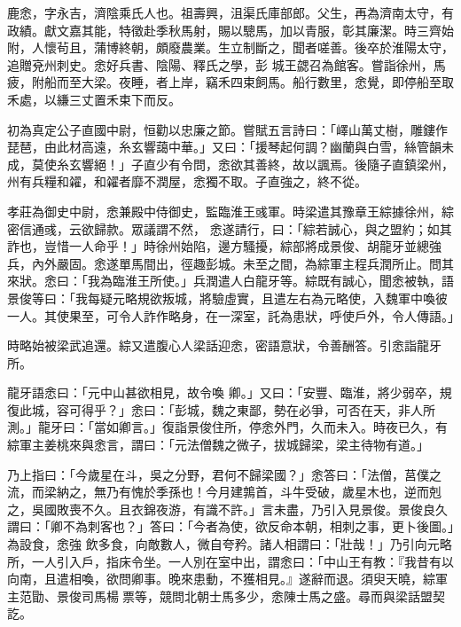 \begin{pinyinscope}
 鹿悆，字永吉，濟陰乘氏人也。祖壽興，沮渠氏庫部郎。父生，再為濟南太守，有政績。獻文嘉其能，特徵赴季秋馬射，賜以驄馬，加以青服，彰其廉潔。時三齊始附，人懷茍且，蒲博終朝，頗廢農業。生立制斷之，聞者嗟善。後卒於淮陽太守，追贈兗州刺史。悆好兵書、陰陽、釋氏之學，彭
 城王勰召為館客。嘗詣徐州，馬疲，附船而至大梁。夜睡，者上岸，竊禾四束飼馬。船行數里，悆覺，即停船至取禾處，以縑三丈置禾束下而反。



 初為真定公子直國中尉，恒勸以忠廉之節。嘗賦五言詩曰：「嶧山萬丈樹，雕鏤作琵琶，由此材高遠，糸玄響藹中華。」又曰：「援琴起何調？幽蘭與白雪，絲管韻未成，莫使糸玄響絕！」子直少有令問，悆欲其善終，故以諷焉。後隨子直鎮梁州，州有兵糧和糴，和糴者靡不潤屋，悆獨不取。子直強之，終不從。



 孝莊為御史中尉，悆兼殿中侍御史，監臨淮王彧軍。時梁遣其豫章王綜據徐州，綜密信通彧，云欲歸款。眾議謂不然，
 悆遂請行，曰：「綜若誠心，與之盟約；如其詐也，豈惜一人命乎！」時徐州始陷，邊方騷擾，綜部將成景俊、胡龍牙並總強兵，內外嚴固。悆遂單馬間出，徑趣彭城。未至之間，為綜軍主程兵潤所止。問其來狀。悆曰：「我為臨淮王所使。」兵潤遣人白龍牙等。綜既有誠心，聞悆被執，語景俊等曰：「我每疑元略規欲叛城，將驗虛實，且遣左右為元略使，入魏軍中喚彼一人。其使果至，可令人詐作略身，在一深室，託為患狀，呼使戶外，令人傳語。」



 時略始被梁武追還。綜又遣腹心人梁話迎悆，密語意狀，令善酬答。引悆詣龍牙所。



 龍牙語悆曰：「元中山甚欲相見，故令喚
 卿。」又曰：「安豐、臨淮，將少弱卒，規復此城，容可得乎？」悆曰：「彭城，魏之東鄙，勢在必爭，可否在天，非人所測。」龍牙曰：「當如卿言。」復詣景俊住所，停悆外門，久而未入。時夜已久，有綜軍主姜桃來與悆言，謂曰：「元法僧魏之微子，拔城歸梁，梁主待物有道。」



 乃上指曰：「今歲星在斗，吳之分野，君何不歸梁國？」悆答曰：「法僧，莒僕之流，而梁納之，無乃有愧於季孫也！今月建鶉首，斗牛受破，歲星木也，逆而剋之，吳國敗喪不久。且衣錦夜游，有識不許。」言未盡，乃引入見景俊。景俊良久謂曰：「卿不為刺客也？」答曰：「今者為使，欲反命本朝，相刺之事，更卜後圖。」為設食，悆強
 飲多食，向敵數人，微自夸矜。諸人相謂曰：「壯哉！」乃引向元略所，一人引入戶，指床令坐。一人別在室中出，謂悆曰：「中山王有教：『我昔有以向南，且遣相喚，欲問卿事。晚來患動，不獲相見。』遂辭而退。須臾天曉，綜軍主范勖、景俊司馬楊票等，競問北朝士馬多少，悆陳士馬之盛。尋而與梁話盟契訖。




\end{pinyinscope}
